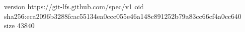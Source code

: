 version https://git-lfs.github.com/spec/v1
oid sha256:eca2096b3288fcac55134ea0ccc055e46a148c891252b79a83cc66cf4a0cc640
size 43840
